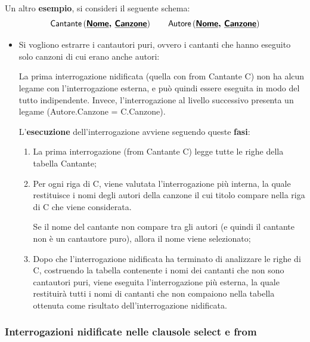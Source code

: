 \documentclass[a4paper]{article}
\begin{document}
	\noindent
	Un altro \textcolor{Green4}{\textbf{esempio}}, si consideri il seguente schema:
	\begin{equation*}
		\textsf{Cantante}\left(\textbf{\textsf{\underline{Nome}}, \textsf{\underline{Canzone}}}\right) \hspace{2em} \textsf{Autore}\left(\textbf{\textsf{\underline{Nome}}, \textsf{\underline{Canzone}}}\right)
	\end{equation*}
	\begin{itemize}
		\item Si vogliono estrarre i cantautori puri, ovvero i cantanti che hanno eseguito solo canzoni di cui erano anche autori:
		
		La prima interrogazione nidificata (quella con \textsf{from Cantante C}) non ha alcun legame con l'interrogazione esterna, e può quindi essere eseguita in modo del tutto indipendente. Invece, l'interrogazione al livello successivo presenta un legame (\textsf{Autore.Canzone = C.Canzone}).
		
		L'\textbf{esecuzione} dell'interrogazione avviene seguendo queste \textbf{fasi}:
		\begin{enumerate}
			\item La prima interrogazione (\textsf{from Cantante C}) legge tutte le righe della tabella \textsf{Cantante};
			
			
			\item Per ogni riga di \textsf{C}, viene valutata l'interrogazione più interna, la quale restituisce i nomi degli autori della canzone il cui titolo compare nella riga di \textsf{C} che viene considerata.
			
			Se il nome del cantante non compare tra gli autori (e quindi il cantante non è un cantautore puro), allora il nome viene selezionato;
			
			
			\item Dopo che l'interrogazione nidificata ha terminato di analizzare le righe di \textsf{C}, costruendo la tabella contenente i nomi dei cantanti che non sono cantautori puri, viene eseguita l'interrogazione più esterna, la quale restituirà tutti i nomi di cantanti che non compaiono nella tabella ottenuta come risultato dell'interrogazione nidificata.
		\end{enumerate}
	\end{itemize}\newpage
	
	\subsubsection{Interrogazioni nidificate nelle clausole \textsf{select} e \textsf{from}}\label{interrogazioni nidificate nelle clausole select e from}
	
\end{document}
